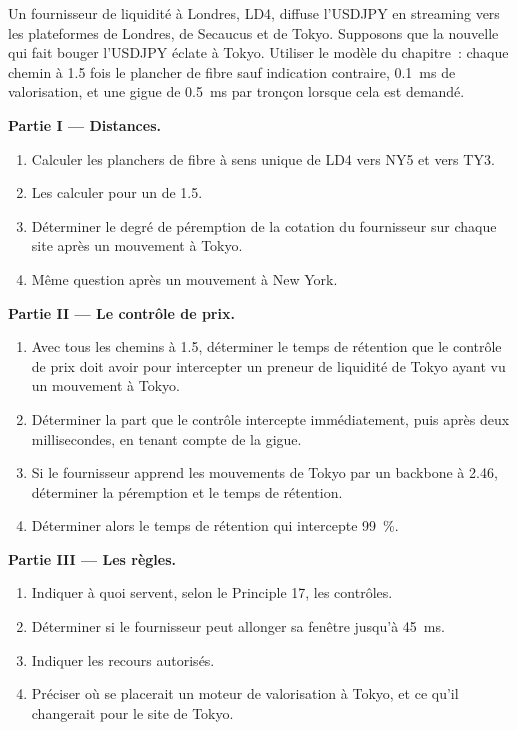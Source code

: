 \begin{problem}\label{pb:nw:fx-connectivity:1}
Un fournisseur de liquidité à Londres, LD4, diffuse l'USDJPY en streaming vers les plateformes de Londres, de Secaucus et de Tokyo. Supposons que la nouvelle qui fait bouger l'USDJPY
éclate à Tokyo. Utiliser le modèle du chapitre~: chaque chemin à 1.5 fois le plancher de fibre sauf indication contraire, \qty{0.1}{\milli\second} de valorisation, et
une gigue de \qty{0.5}{\milli\second} par tronçon lorsque cela est demandé.

\medskip\noindent\textbf{Partie I --- Distances.}
\begin{enumerate}
\item Calculer les planchers de fibre à sens unique de LD4 vers NY5 et vers TY3.
\item Les calculer pour un  de 1.5.
\item Déterminer le degré de péremption de la cotation du fournisseur sur chaque site après un mouvement à Tokyo.
\item Même question après un mouvement à New York.
\end{enumerate}

\medskip\noindent\textbf{Partie II --- Le contrôle de prix.}
\begin{enumerate}[resume]
\item Avec tous les chemins à 1.5, déterminer le temps de rétention que le contrôle de prix doit avoir pour intercepter un preneur de liquidité de Tokyo ayant vu un mouvement à Tokyo.
\item Déterminer la part que le contrôle intercepte immédiatement, puis après deux millisecondes, en tenant compte de la gigue.
\item Si le fournisseur apprend les mouvements de Tokyo par un backbone à 2.46, déterminer la péremption et le temps de rétention.
\item Déterminer alors le temps de rétention qui intercepte 99~\%.
\end{enumerate}

\medskip\noindent\textbf{Partie III --- Les règles.}
\begin{enumerate}[resume]
\item Indiquer à quoi servent, selon le Principle 17, les contrôles.
\item Déterminer si le fournisseur peut allonger sa fenêtre jusqu'à \qty{45}{\milli\second}.
\item Indiquer les recours autorisés.
\item Préciser où se placerait un moteur de valorisation à Tokyo, et ce qu'il changerait pour le site de Tokyo.
\end{enumerate}


\end{problem}
